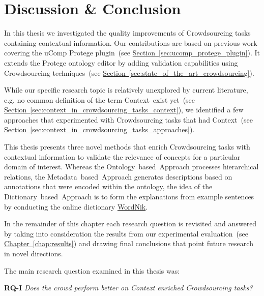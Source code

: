 
\chapter{Discussion \& Conclusion}\label{chap:discussion_and_conclusion}
In this thesis we investigated the quality improvements of Crowdsourcing tasks containing contextual information. Our contributions
are based on previous work covering the uComp Protege plugin~(see \hyperref[sec:ucomp_protege_plugin]{Section~\ref*{sec:ucomp_protege_plugin}}). It extends the Protege ontology editor by adding validation capabilities using Crowdsourcing techniques~(see \hyperref[sec:state_of_the_art_crowdsourcing]{Section~\ref*{sec:state_of_the_art_crowdsourcing}}).  

While our specific research topic is relatively unexplored by current literature, e.g. no common definition of the term \guillemotright Context\guillemotleft~exist yet~(see \hyperref[sec:context_in_crowdsourcing_tasks_context]{Section~\ref*{sec:context_in_crowdsourcing_tasks_context}}),
we identified a few approaches that experimented with Crowdsourcing tasks that had Context~(see \hyperref[sec:context_in_crowdsourcing_tasks_approaches]{Section~\ref*{sec:context_in_crowdsourcing_tasks_approaches}}). 

This thesis presents three novel methods that enrich Crowdsourcing tasks with contextual information to validate the relevance of concepts for a particular domain of interest. Whereas the Ontology~based~Approach processes hierarchical relations, the Metadata~based~Approach generates descriptions based on annotations that were encoded within the ontology, the idea of the Dictionary~based~Approach is to form the explanations from example sentences by conducting the online dictionary \hyperref[sec:wordnik]{WordNik}.

In the remainder of this chapter each research question is revisited and answered by taking into consideration the results from our experimental evaluation~(see \hyperref[chap:results]{Chapter~\ref*{chap:results}}) and drawing final conclusions that point future research in novel directions. 

The main research question examined in this thesis was:
 
\textbf{RQ-I} \emph{Does the crowd perform better on Context enriched Crowdsourcing tasks?}

